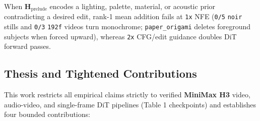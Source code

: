\documentclass[10pt]{article}
\begin{document}
When $\mathbf{H}_{\text{prelude}}$ encodes a lighting, palette, material, or acoustic prior contradicting a desired edit, rank-1 mean addition fails at \texttt{1x} NFE (\texttt{0/5} \texttt{noir} stills and \texttt{0/3} \texttt{192f} videos turn monochrome; \texttt{paper\_origami} deletes foreground subjects when forced upward), whereas \texttt{2x} CFG/edit guidance doubles DiT forward passes.

\subsection{Thesis and Tightened Contributions}

This work restricts all empirical claims strictly to verified \textbf{MiniMax H3} video, audio-video, and single-frame DiT pipelines (Table 1 checkpoints) and establishes four bounded contributions:
\end{document}

